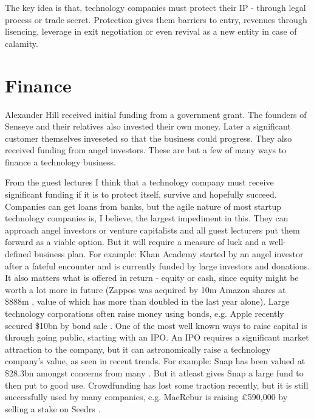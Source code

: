 \documentclass[twocolumn]{bmcart}%
\begin{document}
\par The key idea is that, technology companies must protect their IP - through legal process or trade secret. Protection gives them barriers to entry, revenues through lisencing, leverage in exit negotiation or even revival as a new entity in case of calamity.

\section*{Finance}

Alexander Hill received initial funding from a government grant. The founders of Senseye and their relatives also invested their own money. Later a significant customer themselves inveseted so that the business could progress. They also received funding from angel investors. These are but a few of many ways to finance a technology business.\\

\par From the guest lectures I think that a technology company must receive significant funding if it is to protect itself, survive and hopefully succeed. Companies can get loans from banks, but the agile nature of most startup technology companies is, I believe, the largest impediment in this. They can approach angel investors or venture capitalists and all guest lecturers put them forward as a viable option. But it will require a measure of luck and a well-defined business plan. For example: Khan Academy started by an angel investor after a fateful encounter and is currently funded by large investors and donations. It also matters what is offered in return - equity or cash, since equity might be worth a lot more in future (Zappos was acquired by 10m Amazon shares at \$888m \cite{birchallwaters2009}, value of which has more than doubled in the last year alone). Large technology corporations often raise money using bonds, e.g. Apple recently secured \$10bn by bond sale \cite{platt2017}. One of the most well known ways to raise capital is through going public, starting with an IPO. An IPO requires a significant market attraction to the company, but it can astronomically raise a technology company's value, as seen in recent trends. For example: Snap has been valued at \$28.3bn \cite{bullockkuchler2017} amongst concerns from many \cite{masters2017}. But it atleast gives Snap a large fund to then put to good use. Crowdfunding has lost some traction recently, but it is still successfully used by many companies, e.g. MacRebur is raising £590,000 by selling a stake on Seedrs \cite{bounds2017}.\\
\end{document}
